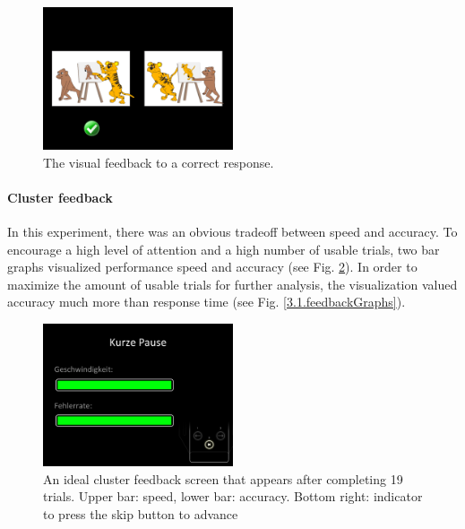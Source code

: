 \begin{figure}[h]
\begin{center}
\vspace{7mm}
\includegraphics[width=0.5\textwidth]{pics/3_1_feedback}
\caption{\label{3.1.feedback} The visual feedback to a correct response.}
\end{center}
\end{figure}

\paragraph{Cluster feedback}
In this experiment, there was an obvious tradeoff between speed and accuracy.
To encourage a high level of attention and a high number of usable trials, two bar graphs visualized performance speed and accuracy (see Fig. \ref{3.1.clusterfeedback}).
In order to maximize the amount of usable trials for further analysis, the visualization valued accuracy much more than response time (see Fig. \ref{3.1.feedbackGraphs}).

\begin{figure}[h]
\begin{center}
\vspace{7mm}
\includegraphics[width=0.5\textwidth]{pics/3_1_clusterfeedback}
\caption{\label{3.1.clusterfeedback} An ideal cluster feedback screen that appears after completing 19 trials. Upper bar: speed, lower bar: accuracy. Bottom right: indicator to  press the skip button to advance}
\end{center}
\end{figure}

